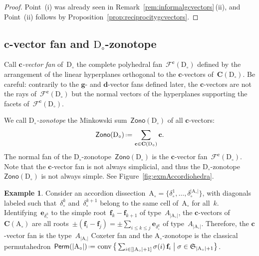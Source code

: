\documentclass{amsart}
\theoremstyle{definition}
\newtheorem{example}[theorem]{Example}
\newcommand{\fS}{\mathfrak{S}} %
\renewcommand{\b}[1]{\mathbf{#1}} %
\newcommand{\bigset}[2]{\big\{ #1 \;\big|\; #2 \big\}} %
\newcommand{\eqdef}{\mbox{\,\raisebox{0.2ex}{\scriptsize\ensuremath{\mathrm:}}\ensuremath{=}\,}} %
\newcommand{\Perm}{\mathsf{Perm}} %
\newcommand{\Zono}{\mathsf{Zono}} %
\DeclareMathOperator{\conv}{conv} %
\newcommand{\fref}[1]{Figure~\ref{#1}} %
\newcommand{\darkblue}{\color{darkblue}} %
\newcommand{\defn}[1]{\textsl{\darkblue #1}} %
\newcommand{\dissection}{\mathrm{D}} %
\newcommand{\accordion}{\mathrm{A}} %
\newcommand{\allcvectors}[1]{\mathbf{C}(#1)} %
\newcommand{\cvectorFan}{\mathcal{F}^\mathbf{c}} %
\begin{document}
\begin{proof}
Point~(i) was already seen in Remark~\ref{rem:informalgcvectors}\,(ii), and Point~(ii) follows by Proposition~\ref{prop:reciprocitygcvectors}.
\end{proof}


\subsection{$\b{c}$-vector fan and $\dissection_\circ$-zonotope}

Call \defn{$\b{c}$-vector fan} of~$\dissection_\circ$ the complete polyhedral fan~$\cvectorFan(\dissection_\circ)$ defined by the arrangement of the linear hyperplanes orthogonal to the $\b{c}$-vectors of~$\allcvectors{\dissection_\circ}$. Be careful: contrarily to the $\b{g}$- and $\b{d}$-vector fans defined later, the $\b{c}$-vectors are not the rays of~$\cvectorFan(\dissection_\circ)$ but the normal vectors of the hyperplanes supporting the facets of~$\cvectorFan(\dissection_\circ)$.

We call \defn{$\dissection_\circ$-zonotope} the Minkowski sum~$\Zono(\dissection_\circ)$ of all $\b{c}$-vectors:
\[
\Zono(\dissection_\circ) \eqdef \sum_{\b{c} \in \allcvectors{\dissection_\circ}} \b{c}.
\]
The normal fan of the $\dissection_\circ$-zonotope~$\Zono(\dissection_\circ)$ is the $\b{c}$-vector fan~$\cvectorFan(\dissection_\circ)$. Note that the $\b{c}$-vector fan is not always simplicial, and thus the $\dissection_\circ$-zonotope~$\Zono(\dissection_\circ)$ is not always simple. See \fref{fig:exmAccordiohedra}.

\begin{example}
Consider an accordion dissection~$\accordion_\circ = \{\delta_\circ^1, \dots, \delta_\circ^{|\accordion_\circ|}\}$, with diagonals labeled such that~$\delta_\circ^k$ and~$\delta_\circ^{k+1}$ belong to the same cell of~$\accordion_\circ$ for all~$k$. Identifying~$\b{e}_{\delta_\circ^k}$ to the simple root~$\b{f}_k - \b{f}_{k+1}$ of type~$A_{|\accordion_\circ|}$, the $\b{c}$-vectors of~$\allcvectors{\accordion_\circ}$ are all roots~$\pm (\b{f}_i - \b{f}_j) = \pm \sum_{i \le k \le j} \b{e}_{\delta_\circ^k}$ of type~$A_{|\accordion_\circ|}$. Therefore, the $\b{c}$-vector fan is the type~$A_{|\accordion_\circ|}$ Coxeter fan and the $\accordion_\circ$-zonotope is the classical permutahedron~$\Perm(|\accordion_\circ|) \eqdef \conv \bigset{ \sum_{i \in [|\accordion_\circ|+1]} \sigma(i) \, \b{f}_i}{\sigma \in \fS_{|\accordion_\circ|+1}}$.
\end{example}
\end{document}
